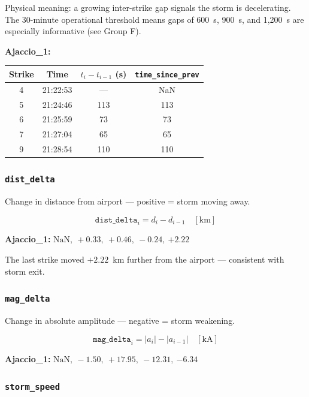 \documentclass[12pt,a4paper]{article}
\newcommand{\feat}[1]{\texttt{\textbf{#1}}}
\begin{document}
Physical meaning: a growing inter-strike gap signals the storm is decelerating. The 30-minute operational threshold means gaps of 600~s, 900~s, and 1,200~s are especially informative (see Group F).

\textbf{Ajaccio\_1:}

\begin{center}
\begin{tabular}{cccc}
\toprule
Strike & Time & $t_i - t_{i-1}$ (s) & \texttt{time\_since\_prev} \\
\midrule
4 & 21:22:53 & --- & NaN \\
5 & 21:24:46 & 113 & 113 \\
6 & 21:25:59 & 73  & 73  \\
7 & 21:27:04 & 65  & 65  \\
9 & 21:28:54 & 110 & 110 \\
\bottomrule
\end{tabular}
\end{center}

\subsubsection*{\feat{dist\_delta}}

Change in distance from airport --- positive = storm moving away.

\begin{formulabox}
\[
  \texttt{dist\_delta}_i = d_i - d_{i-1} \quad [\text{km}]
\]
\end{formulabox}

\textbf{Ajaccio\_1:} $\text{NaN},\ +0.33,\ +0.46,\ -0.24,\ \mathbf{+2.22}$

The last strike moved $+2.22$~km further from the airport --- consistent with storm exit.

\subsubsection*{\feat{mag\_delta}}

Change in absolute amplitude --- negative = storm weakening.

\begin{formulabox}
\[
  \texttt{mag\_delta}_i = |a_i| - |a_{i-1}| \quad [\text{kA}]
\]
\end{formulabox}

\textbf{Ajaccio\_1:} $\text{NaN},\ -1.50,\ +17.95,\ -12.31,\ \mathbf{-6.34}$

\subsubsection*{\feat{storm\_speed}}
\end{document}
